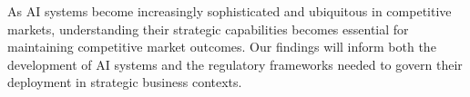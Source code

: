 As AI systems become increasingly sophisticated and ubiquitous in competitive markets, understanding their strategic capabilities becomes essential for maintaining competitive market outcomes. Our findings will inform both the development of AI systems and the regulatory frameworks needed to govern their deployment in strategic business contexts.